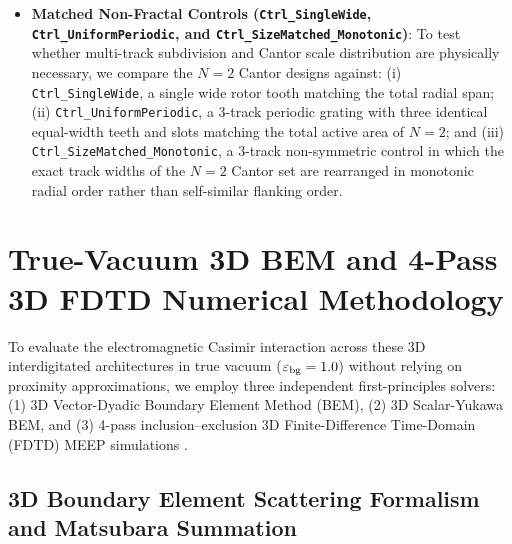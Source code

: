 \documentclass[11pt,letterpaper]{article}
\begin{document}
\begin{itemize}
    \item \textbf{Matched Non-Fractal Controls (\texttt{Ctrl\_SingleWide}, \texttt{Ctrl\_UniformPeriodic}, and \texttt{Ctrl\_SizeMatched\_Monotonic})}: To test whether multi-track subdivision and Cantor scale distribution are physically necessary, we compare the $N=2$ Cantor designs against: (i) \texttt{Ctrl\_SingleWide}, a single wide rotor tooth matching the total radial span; (ii) \texttt{Ctrl\_UniformPeriodic}, a 3-track periodic grating with three identical equal-width teeth and slots matching the total active area of $N=2$; and (iii) \texttt{Ctrl\_SizeMatched\_Monotonic}, a 3-track non-symmetric control in which the exact track widths of the $N=2$ Cantor set are rearranged in monotonic radial order rather than self-similar flanking order.
\end{itemize}


\section{True-Vacuum 3D BEM and 4-Pass 3D FDTD Numerical Methodology}
\label{sec:fdtd_methodology}

To evaluate the electromagnetic Casimir interaction across these 3D interdigitated architectures in true vacuum ($\varepsilon_{\rm bg}=1.0$) without relying on proximity approximations, we employ three independent first-principles solvers: (1) 3D Vector-Dyadic Boundary Element Method (BEM), (2) 3D Scalar-Yukawa BEM, and (3) 4-pass inclusion--exclusion 3D Finite-Difference Time-Domain (FDTD) MEEP simulations \cite{oskooi2010,rodriguez2011}.

\subsection{3D Boundary Element Scattering Formalism and Matsubara Summation}
\end{document}
